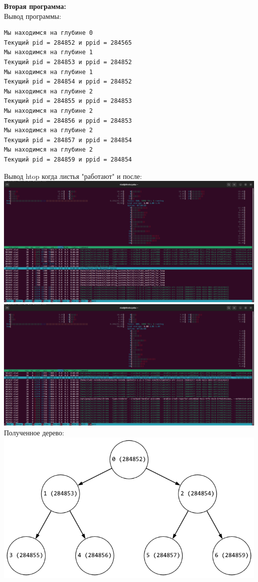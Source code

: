 \documentclass[a4paper,14pt]{extarticle}
\begin{document}
\textbf{Вторая программа:}\\
Вывод программы:\\
\begin{verbatim}
Мы находимся на глубине 0
Текущий pid = 284852 и ppid = 284565
Мы находимся на глубине 1
Текущий pid = 284853 и ppid = 284852
Мы находимся на глубине 1
Текущий pid = 284854 и ppid = 284852
Мы находимся на глубине 2
Текущий pid = 284855 и ppid = 284853
Мы находимся на глубине 2
Текущий pid = 284856 и ppid = 284853
Мы находимся на глубине 2
Текущий pid = 284857 и ppid = 284854
Мы находимся на глубине 2
Текущий pid = 284859 и ppid = 284854
\end{verbatim}
Вывод htop когда листья "работают" и после:\\
\includegraphics[width=140mm]{for_loop_htop_before}\\
\includegraphics[width=140mm]{for_loop_htop_after}\\
Полученное дерево:\\
\includegraphics[width=140mm]{for_loop.png}\\
\end{document}
